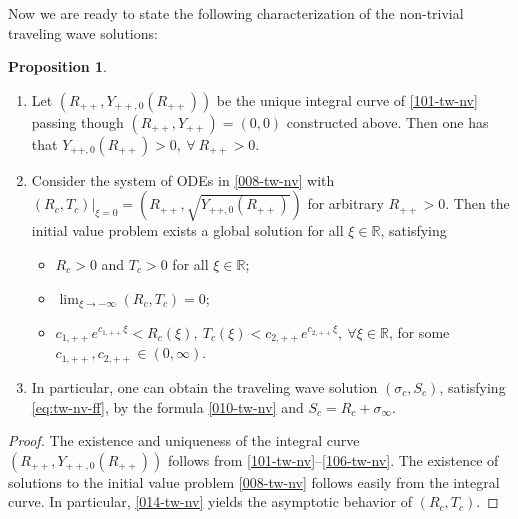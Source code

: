 \documentclass[12pt]{article}
\theoremstyle{definition}
\newtheorem{proposition}[theorem]{Proposition}
\theoremstyle{remark}
\numberwithin{equation}{section}
\begin{document}
Now we are ready to state the following characterization of the non-trivial traveling wave solutions: 
\begin{proposition}
\label{prop:tw++}
\begin{enumerate}
    \item Let $ (R_{++}, Y_{{++},0}(R_{++}) ) $ be the unique integral curve of \eqref{101-tw-nv} passing though $ (R_{++}, Y_{++}) = (0,0) $ constructed above. Then one has that $ Y_{++,0}(R_{++}) > 0, \ \forall \ R_{++} > 0 $.   

    \item 
    Consider the system of ODEs in \eqref{008-tw-nv} with $ (R_c, T_c)\vert_{\xi = 0} = (R_{++}, \sqrt{Y_{++,0}(R_{++})}) $ for arbitrary $ R_{++} > 0 $. 
    Then the initial value problem exists a global solution for all $ \xi \in \mathbb R $, satisfying
    \begin{itemize}
        \item $ R_c > 0 $ and $ T_c > 0 $ for all $ \xi \in \mathbb R $; 
        \item $ \lim_{\xi\rightarrow -\infty} (R_c, T_c) = 0 $;
        \item $ c_{1,++} e^{ c_{1,++} \xi} < R_c(\xi) , \ T_c(\xi) < c_{2,++} e^{ c_{2,++} \xi}, \ \forall \xi \in \mathbb R $, for some $ c_{1,++}, c_{2,++} \in (0,\infty) $. 
    \end{itemize}

    \item
    In particular, one can obtain the traveling wave solution $ (\sigma_c, S_c) $, satisfying \eqref{eq:tw-nv-ff}, by the formula \eqref{010-tw-nv} and $ S_c = R_c + \sigma_\infty $. 
    \end{enumerate}
    
\end{proposition}
\begin{proof}
The existence and uniqueness of the integral curve $ (R_{++}, Y_{{++},0}(R_{++}) ) $ follows from \eqref{101-tw-nv}--\eqref{106-tw-nv}. The existence of solutions to the initial value problem \eqref{008-tw-nv} follows easily from the integral curve. In particular, \eqref{014-tw-nv} yields the asymptotic behavior of $ (R_c, T_c) $. 
\end{proof}
\end{document}
